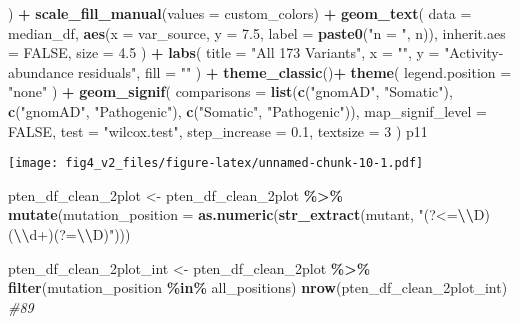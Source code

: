 \documentclass[
]{article}
\newenvironment{Shaded}{\begin{snugshade}}{\end{snugshade}}
\newcommand{\AttributeTok}[1]{\textcolor[rgb]{0.13,0.29,0.53}{#1}}
\newcommand{\CommentTok}[1]{\textcolor[rgb]{0.56,0.35,0.01}{\textit{#1}}}
\newcommand{\ConstantTok}[1]{\textcolor[rgb]{0.56,0.35,0.01}{#1}}
\newcommand{\DecValTok}[1]{\textcolor[rgb]{0.00,0.00,0.81}{#1}}
\newcommand{\FloatTok}[1]{\textcolor[rgb]{0.00,0.00,0.81}{#1}}
\newcommand{\FunctionTok}[1]{\textcolor[rgb]{0.13,0.29,0.53}{\textbf{#1}}}
\newcommand{\NormalTok}[1]{#1}
\newcommand{\OtherTok}[1]{\textcolor[rgb]{0.56,0.35,0.01}{#1}}
\newcommand{\SpecialCharTok}[1]{\textcolor[rgb]{0.81,0.36,0.00}{\textbf{#1}}}
\newcommand{\StringTok}[1]{\textcolor[rgb]{0.31,0.60,0.02}{#1}}
\begin{document}
\begin{Shaded}
\begin{Highlighting}[]
\NormalTok{  ) }\SpecialCharTok{+}
  \FunctionTok{scale\_fill\_manual}\NormalTok{(}\AttributeTok{values =}\NormalTok{ custom\_colors) }\SpecialCharTok{+}
  \FunctionTok{geom\_text}\NormalTok{(}
    \AttributeTok{data =}\NormalTok{ median\_df,}
    \FunctionTok{aes}\NormalTok{(}\AttributeTok{x =}\NormalTok{ var\_source, }\AttributeTok{y =} \FloatTok{7.5}\NormalTok{, }\AttributeTok{label =} \FunctionTok{paste0}\NormalTok{(}\StringTok{"n = "}\NormalTok{, n)),}
    \AttributeTok{inherit.aes =} \ConstantTok{FALSE}\NormalTok{,}
    \AttributeTok{size =} \FloatTok{4.5}
\NormalTok{  ) }\SpecialCharTok{+}
  \FunctionTok{labs}\NormalTok{(}
    \AttributeTok{title =} \StringTok{"All 173 Variants"}\NormalTok{,}
    \AttributeTok{x =} \StringTok{""}\NormalTok{,}
    \AttributeTok{y =} \StringTok{"Activity{-}abundance residuals"}\NormalTok{,}
    \AttributeTok{fill =} \StringTok{""}
\NormalTok{  ) }\SpecialCharTok{+} \FunctionTok{theme\_classic}\NormalTok{()}\SpecialCharTok{+}
  \FunctionTok{theme}\NormalTok{(}
    \AttributeTok{legend.position =} \StringTok{"none"}
\NormalTok{  ) }\SpecialCharTok{+}
  \FunctionTok{geom\_signif}\NormalTok{(}
    \AttributeTok{comparisons =} \FunctionTok{list}\NormalTok{(}\FunctionTok{c}\NormalTok{(}\StringTok{"gnomAD"}\NormalTok{, }\StringTok{"Somatic"}\NormalTok{), }
                       \FunctionTok{c}\NormalTok{(}\StringTok{"gnomAD"}\NormalTok{, }\StringTok{"Pathogenic"}\NormalTok{), }
                       \FunctionTok{c}\NormalTok{(}\StringTok{"Somatic"}\NormalTok{, }\StringTok{"Pathogenic"}\NormalTok{)),}
    \AttributeTok{map\_signif\_level =} \ConstantTok{FALSE}\NormalTok{,}
    \AttributeTok{test =} \StringTok{"wilcox.test"}\NormalTok{,}
    \AttributeTok{step\_increase =} \FloatTok{0.1}\NormalTok{,}
    \AttributeTok{textsize =} \DecValTok{3}
\NormalTok{  ) }
\NormalTok{p11}
\end{Highlighting}
\end{Shaded}

\texttt{[image: fig4\_v2\_files/figure-latex/unnamed-chunk-10-1.pdf]}

\begin{Shaded}
\begin{Highlighting}[]
\NormalTok{pten\_df\_clean\_2plot }\OtherTok{\textless{}{-}}\NormalTok{ pten\_df\_clean\_2plot }\SpecialCharTok{\%\textgreater{}\%}
  \FunctionTok{mutate}\NormalTok{(}\AttributeTok{mutation\_position =} \FunctionTok{as.numeric}\NormalTok{(}\FunctionTok{str\_extract}\NormalTok{(mutant, }\StringTok{"(?\textless{}=}\SpecialCharTok{\textbackslash{}\textbackslash{}}\StringTok{D)(}\SpecialCharTok{\textbackslash{}\textbackslash{}}\StringTok{d+)(?=}\SpecialCharTok{\textbackslash{}\textbackslash{}}\StringTok{D)"}\NormalTok{)))}

\NormalTok{pten\_df\_clean\_2plot\_int }\OtherTok{\textless{}{-}}\NormalTok{ pten\_df\_clean\_2plot }\SpecialCharTok{\%\textgreater{}\%} \FunctionTok{filter}\NormalTok{(mutation\_position }\SpecialCharTok{\%in\%}\NormalTok{ all\_positions)}
\FunctionTok{nrow}\NormalTok{(pten\_df\_clean\_2plot\_int) }\CommentTok{\#89}
\end{Highlighting}
\end{Shaded}
\end{document}
